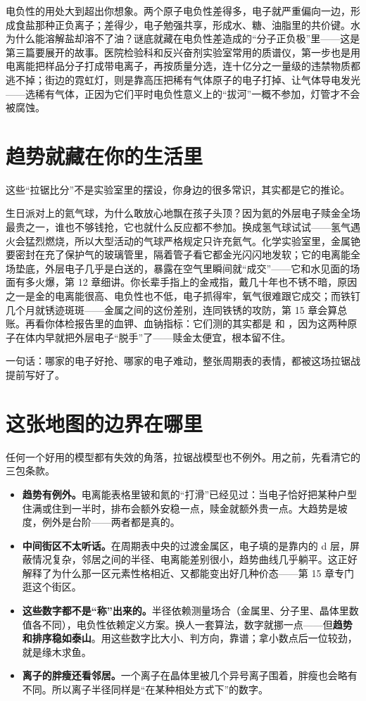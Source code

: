 电负性的用处大到超出你想象。两个原子电负性差得多，电子就严重偏向一边，形成食盐那种正负离子；差得少，电子勉强共享，形成水、糖、油脂里的共价键。水为什么能溶解盐却溶不了油？谜底就藏在电负性差造成的“分子正负极”里——这是第三篇要展开的故事。医院检验科和反兴奋剂实验室常用的质谱仪，第一步也是用电离能把样品分子打成带电离子，再按质量分选，连十亿分之一量级的违禁物质都逃不掉；街边的霓虹灯，则是靠高压把稀有气体原子的电子打掉、让气体导电发光——选稀有气体，正因为它们平时电负性意义上的“拔河”一概不参加，灯管才不会被腐蚀。

\section{趋势就藏在你的生活里}

这些“拉锯比分”不是实验室里的摆设，你身边的很多常识，其实都是它的推论。

生日派对上的氦气球，为什么敢放心地飘在孩子头顶？因为氦的外层电子赎金全场最贵之一，谁也不够钱抢，它也就什么反应都不参加。换成氢气球试试——氢气遇火会猛烈燃烧，所以大型活动的气球严格规定只许充氦气。化学实验室里，金属铯要密封在充了保护气的玻璃管里，隔着管子看它都金光闪闪地发软；它的电离能全场垫底，外层电子几乎是白送的，暴露在空气里瞬间就“成交”——它和水见面的场面有多火爆，第 12 章细讲。你长辈手指上的金戒指，戴几十年也不锈不暗，原因之一是金的电离能很高、电负性也不低，电子抓得牢，氧气很难跟它成交；而铁钉几个月就锈迹斑斑——金属之间的这份差别，连同铁锈的攻防，第 15 章会算总账。再看你体检报告里的血钾、血钠指标：它们测的其实都是  和 ，因为这两种原子在体内早就把外层电子“脱手”了——赎金太便宜，根本留不住。

一句话：哪家的电子好抢、哪家的电子难动，整张周期表的表情，都被这场拉锯战提前写好了。

\section{这张地图的边界在哪里}

任何一个好用的模型都有失效的角落，拉锯战模型也不例外。用之前，先看清它的三包条款。

\begin{itemize}[itemsep=2pt]
\item \textbf{趋势有例外。}电离能表格里铍和氮的“打滑”已经见过：当电子恰好把某种户型住满或住到一半时，排布会额外安稳一点，赎金就额外贵一点。大趋势是坡度，例外是台阶——两者都是真的。
\item \textbf{中间街区不太听话。}在周期表中央的过渡金属区，电子填的是靠内的 d 层，屏蔽情况复杂，邻居之间的半径、电离能差别很小，趋势曲线几乎躺平。这正好解释了为什么那一区元素性格相近、又都能变出好几种价态——第 15 章专门逛这个街区。
\item \textbf{这些数字都不是“称”出来的。}半径依赖测量场合（金属里、分子里、晶体里数值各不同），电负性依赖定义方案。换人一套算法，数字就挪一点——但\textbf{趋势和排序稳如泰山}。用这些数字比大小、判方向，靠谱；拿小数点后一位较劲，就是缘木求鱼。
\item \textbf{离子的胖瘦还看邻居。}一个离子在晶体里被几个异号离子围着，胖瘦也会略有不同。所以离子半径同样是“在某种相处方式下”的数字。
\end{itemize}

